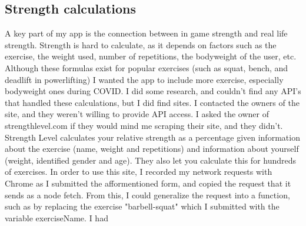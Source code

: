 \documentclass{l4proj}
\begin{document}
\subsection{Strength calculations}
A key part of my app is the connection between in game strength and real life strength. Strength is hard to calculate, as it depends on factors such as the exercise, the weight used, number of repetitions, the bodyweight of the user, etc. Although these formulas exist for popular exercises (such as squat, bench, and deadlift in powerlifting) I wanted the app to include more exercise, especially bodyweight ones during COVID. I did some research, and couldn't find any API's that handled these calculations, but I did find sites. I contacted the owners of the site, and they weren't willing to provide API access. I asked the owner of strengthlevel.com if they would mind me scraping their site, and they didn't. Strength Level calculates your relative strength as a percentage given information about the exercise (name, weight and repetitions) and information about yourself (weight, identified gender and age). They also let you calculate this for hundreds of exercises. In order to use this site, I recorded my network requests with Chrome as I submitted the afformentioned form, and copied the request that it sends as a node fetch. From this, I could generalize the request into a function, such as by replacing the exercise "barbell-squat" which I submitted with the variable exerciseName. I had 
\end{document}
